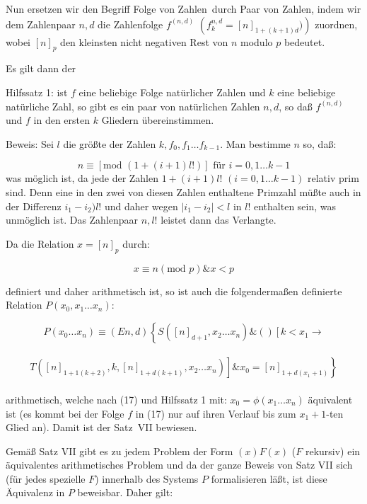 \documentclass[draft]{scrartcl}
\begin{document}
Nun ersetzen wir den Begriff \glqq Folge von Zahlen\grqq\ durch 
\glqq Paar von Zahlen\grqq, indem wir dem Zahlenpaar $n, d$ 
die Zahlenfolge $f^{\left(n, d\right)}$ $\left(f_k^{n, d} = \left[n\right]_{1 + \left(k + 1\right) d})\right)$
zuordnen, wobei $\left[n\right]_p$ den kleinsten nicht negativen Rest von $n$ modulo $p$ bedeutet.

Es gilt dann der

Hilfssatz 1: ist $f$ eine beliebige Folge natürlicher 
Zahlen und $k$ eine beliebige natürliche Zahl, so gibt es
ein paar von natürlichen Zahlen $n, d$, so daß $f^{\left(n, d\right)}$ 
und $f$ in den ersten $k$ Gliedern übereinstimmen.

Beweis: Sei $l$ die größte der Zahlen $k, f_0, f_1 \dots f_{k - 1}$. Man bestimme $n$ so, daß:

$$
n \equiv \left[\text{mod }\left(1 + \left(i + 1\right) l!\right)\right]\text{ für } i = 0, 1 \dots k - 1
		$$
		was möglich ist, da jede der Zahlen $1 + \left(i + 1\right) l!$ $\left(i = 0, 1 \dots k - 1\right)$
		relativ prim sind. Denn eine in den zwei von diesen Zahlen enthaltene Primzahl 
		müßte auch in der Differenz $i_1 - i_2)l!$ und daher wegen
$\left|i_1 - i_2\right| < l$ in $l!$ enthalten sein, was unmöglich
ist. Das Zahlenpaar $n, l!$ leistet dann das Verlangte.

Da die Relation $x = \left[n\right]_p$ durch:

$$
x \equiv n \left(\text{mod } p\right) \& x < p
$$

definiert und daher arithmetisch ist, so ist auch die folgendermaßen definierte Relation $P\left(x_0, x_1 \dots x_n\right)$:

$$
P\left(x_0 \dots x_n\right) \equiv \left(En, d\right) \left\{S\left(\left[n\right]_{d + 1}, x_2 \dots x_n\right) \& \left(\right) \left[k < x_1 \longrightarrow\right.\right.
$$\\[\spacebetweenbreakedequations]
$$ \left.\left.T\left(\left[n\right]_{1 + 1 \left(k + 2\right)}, k, \left[n\right]_{1 + d \left(k + 1\right)}, x_2 \dots x_n\right)\right] \& x_0 = \left[n\right]_{1 + d \left(x_1 + 1\right)}\right\}
$$\\[\spaceafterbreakedequation]
arithmetisch, welche nach (17) und Hilfssatz 1 mit:
$x_0 = \phi\left(x_1 \dots x_n\right)$ äquivalent ist (es kommt
		bei der Folge $f$ in (17) nur auf ihren Verlauf 
		bis zum $x_1 + 1$-ten Glied an). Damit ist der
Satz~VII bewiesen.

Gemäß Satz VII gibt es zu jedem Problem der Form
$\left(x\right)F\left(x\right)$ ($F$ rekursiv) ein äquivalentes arithmetisches
Problem und da der ganze Beweis von Satz VII sich (für jedes spezielle $F$) innerhalb des Systems $P$ formalisieren läßt, ist diese Äquivalenz in $P$ beweisbar. Daher gilt:
\end{document}
